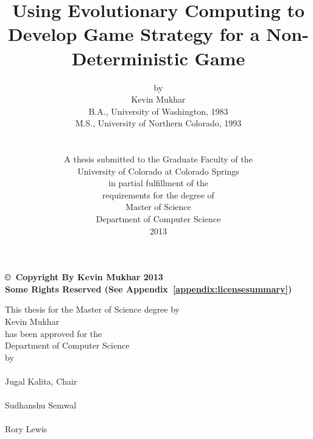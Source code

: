 
\title{\bf {\LARGE Using Evolutionary Computing to Develop Game Strategy for a Non-Deterministic Game}}
\author{by \\ Kevin Mukhar \\  B.A., University of Washington, 1983 \\ 
M.S., University of Northern Colorado, 1993 
\\
\\
\\ A thesis submitted to the Graduate Faculty of the \\
University of Colorado at Colorado Springs \\
in partial fulfillment of the \\
requirements for the degree of \\
Master of Science \\
Department of Computer Science \\
2013 }
\date{}

\maketitle

\setcounter{page}{2}

\newpage

\pagestyle{plain}

\begin{minipage}[t]{5.0in}
	\vspace{7.0in}
	\bf \copyright \ Copyright By Kevin Mukhar 2013 \\[-1.0pc]
	Some Rights Reserved (See Appendix~\ref{appendix:licensesummary}) \rm
\end{minipage}



\newpage

\begin{center}
	This thesis for the Master of Science degree by \\
	Kevin Mukhar \\
	has been approved for the \\
 	Department of Computer Science \\
	by \\ 
	\vspace{3.0pc}
	\makebox[3in]{\hrulefill} \\[-1.0pc]
	Jugal Kalita, Chair \\
	\vspace{3.0pc}
	\makebox[3in]{\hrulefill} \\[-1.0pc] 
	Sudhanshu Semwal \\
	\vspace{3.0pc}
	\makebox[3in]{\hrulefill} \\[-1.0pc] 
	Rory Lewis \\
\end{center}



